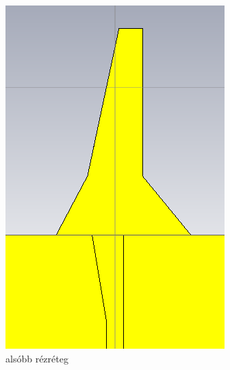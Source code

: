 \begin{figure}[h]
	\centering
	\begin{subfigure}[b]{0.3\textwidth}
		\centering
		\includegraphics[width=\textwidth]{kep/results/balun_1.png}
		\caption{alsóbb rézréteg}
	\end{subfigure}
	\hfill
	\begin{subfigure}[b]{0.3\textwidth}
		\centering

\end{subfigure}
\end{figure}
